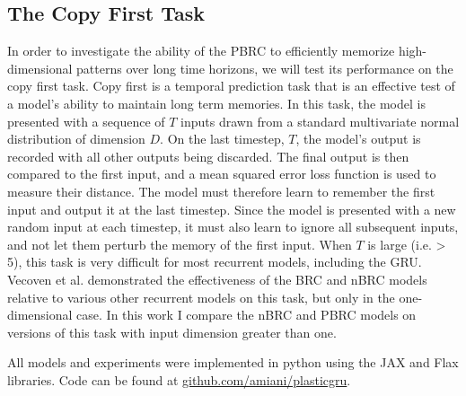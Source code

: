 \subsection*{The Copy First Task}

In order to investigate the ability of the PBRC to efficiently memorize high-dimensional patterns over long time horizons, we will test its performance on the copy first task.
Copy first is a temporal prediction task that is an effective test of a model's ability to maintain long term memories. In this task, the model is presented with a sequence of \(T\) inputs drawn from a standard multivariate normal distribution of dimension \(D\). On the last timestep, \(T\), the model's output is recorded with all other outputs being discarded. The final output is then compared to the first input, and a mean squared error loss function is used to measure their distance. The model must therefore learn to remember the first input and output it at the last timestep. Since the model is presented with a new random input at each timestep, it must also learn to ignore all subsequent inputs, and not let them perturb the memory of the first input. When \(T\) is large (i.e. > 5), this task is very difficult for most recurrent models, including the GRU. Vecoven et al.\cite{vecoven2021brc} demonstrated the effectiveness of the BRC and nBRC models relative to various other recurrent models on this task, but only in the one-dimensional case. In this work I compare the nBRC and PBRC models on versions of this task with input dimension greater than one.

All models and experiments were implemented in python using the JAX\cite{jax2018github} and Flax\cite{flax2020github} libraries. Code can be found at \href{https://github.com/amiani/plasticgru}{github.com/amiani/plasticgru}.
